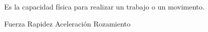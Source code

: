 
\question Es la capacidad física para realizar un trabajo o un movimento.

  \begin{oneparchoices}
    \CorrectChoice Fuerza
    \choice Rapidez
    \choice Aceleración
    \choice Rozamiento
  \end{oneparchoices}
  \answerline[A]
